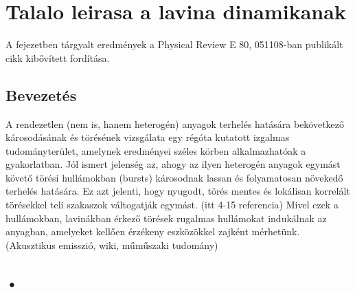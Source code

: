 \chapter{Talalo leirasa a lavina dinamikanak}
\label{chapter:thesispoint_1}
A fejezetben tárgyalt eredmények a Physical Review E 80, 051108-ban publikált cikk
kibővített fordítása.

\section{Bevezetés}
A rendezetlen (nem is, hanem heterogén) anyagok terhelés hatására bekövetkező károsodásának és törésének vizsgálata
egy régóta kutatott izgalmas tudományterület, amelynek eredményei széles körben alkalmazhatóak
a gyakorlatban.\cite{thsp1_herrmann1990,thsp1_chakrabarti1997} Jól ismert jelenség az, ahogy
az ilyen heterogén anyagok egymást követő törési hullámokban (bursts) károsodnak lassan és folyamatosan növekedő terhelés hatására. Ez azt jelenti, hogy nyugodt, törés mentes és
lokálisan korrelált törésekkel teli szakaszok váltogatják egymást.  (itt 4-15 referencia)
Mivel ezek a hullámokban, lavinákban érkező törések rugalmas hullámokat indukálnak az anyagban,
amelyeket kellően érzékeny eszközökkel zajként mérhetünk. (Akusztikus emisszió, wiki, műműszaki tudomány) 



\section{•}